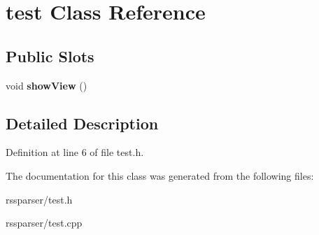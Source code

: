 \hypertarget{classtest}{\section{test Class Reference}
\label{classtest}
}
\subsection*{Public Slots}
\begin{DoxyCompactItemize}
\item 
\hypertarget{classtest_a5536afbc47ae39e41cc9497421480f0a}{void {\bfseries show\-View} ()}\label{classtest_a5536afbc47ae39e41cc9497421480f0a}

\end{DoxyCompactItemize}


\subsection{Detailed Description}


Definition at line 6 of file test.\-h.



The documentation for this class was generated from the following files\-:\begin{DoxyCompactItemize}
\item 
rssparser/test.\-h\item 
rssparser/test.\-cpp\end{DoxyCompactItemize}
